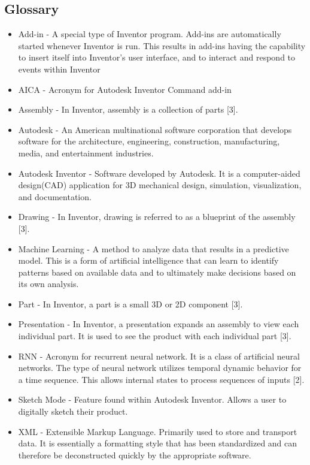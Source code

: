 \documentclass[onecolumn, draftclsnofoot,10pt, compsoc]{IEEEtran}
\begin{document}
\subsection{Glossary}
\begin{itemize}
    \item Add-in - A special type of Inventor program. Add-ins are automatically started whenever Inventor is run. This results in add-ins having the capability to insert itself into Inventor’s user interface, and to interact and respond to events within Inventor
    \item AICA - Acronym for Autodesk Inventor Command add-in
    \item Assembly - In Inventor, assembly is a collection of parts [3]. 
    \item Autodesk - An American multinational software corporation that develops software for the architecture, engineering, construction, manufacturing, media, and entertainment industries.
    \item Autodesk Inventor - Software developed by Autodesk. It is a computer-aided design(CAD) application for 3D mechanical design, simulation, visualization, and documentation.
    \item Drawing - In Inventor, drawing is referred to as a blueprint of the assembly [3].
    \item Machine Learning - A method to analyze data that results in a predictive model. This is a form of artificial intelligence that can learn to identify patterns based on available data and to ultimately make decisions based on its own analysis.
    \item Part - In Inventor, a part is a small 3D or 2D component [3].
    \item Presentation - In Inventor, a presentation expands an assembly to view each individual part. It is used to see the product with each individual part [3].
    \item RNN - Acronym for recurrent neural network. It is a class of artificial neural networks. The type of neural network utilizes temporal dynamic behavior for a time sequence. This allows internal states to process sequences of inputs [2].
    \item Sketch Mode - Feature found within Autodesk Inventor. Allows a user to digitally sketch their product.
    \item XML - Extensible Markup Language. Primarily used to store and transport data. It is essentially a formatting style that has been standardized and can therefore be deconstructed quickly by the appropriate software.

\end{itemize}
\end{document}
